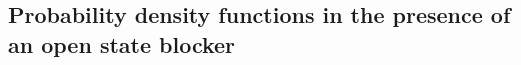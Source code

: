 \begin{comment}
If we aim for a drug that works independent of
the concentrations, we need to replace this expression by a constant value. As discussed above, the probability
density functions rapidly reach equilibrium (see Figure \ref{1D/spacetime}) and therefore we can
concentrate on the steady state solution. Let $\rho_{o,\mu}(x)$ denote
the steady state open probability density function, defined by (\ref{rho_o}). 
\K{zzz Uttrykket det refereres til ligger n\r{a} i neste kapittel. Er det greit? Det tilsvarende resultatet er nevnt i forrige kapittel i seksjon \ref{sec:analytical} for $\mu = 1$ og gitte parameterverdier.}
We use
this distribution to define the characterization
\begin{equation}
\bar{\delta}_{o,\mu}=\frac{\mu-1}{\mu}\frac{1}{\int_{c_{0}}^{c_{+}}\rho_{o,\mu
}(x)dx}\int_{c_{0}}^{c_{+}}\rho_{o,\mu
}(x)\frac{k_{oc}(x)}{k_{co}(x)} dx. \label{open_charac}
\end{equation} 
\K{zzz Jeg forst\r{a}r ikke hvor dette uttrykket kommer fra.}
The drug is given by the parameters $k_{ob}$ and $k_{bo}$ and they are now
related as follows,
\begin{equation}
k_{ob}=\bar{\delta}_{o,\mu}k_{bo.} \label{kob}
\end{equation}
In the analysis of open state blockers, we will use $k_{bo}$ as the control
parameter, and we let $k_{ob}$ be given by the relation $\left(
\ref{kob}\right) .$

\end{comment}


\subsection{Probability density functions in the presence of an open state
blocker}

